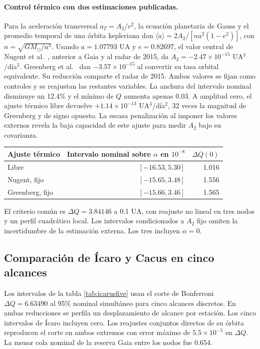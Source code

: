 \documentclass[11pt,a4paper]{article}
\begin{document}
\paragraph{Control térmico con dos estimaciones publicadas.}
Para la aceleración transversal $a_T=A_2/r^2$, la ecuación planetaria de Gauss y el promedio temporal de una órbita kepleriana dan
$\langle\dot a\rangle=2A_2/[na^2(1-e^2)]$, con $n=\sqrt{GM_\odot/a^3}$. Usando $a=1.07793$ UA y $e=0.82697$, el valor central de Nugent et al.\ \cite{nugent}, anterior a Gaia y al radar de 2015, da $A_2=-2.47\times10^{-15}$ UA$^3$/día$^2$. Greenberg et al.\ \cite{icarusradar} dan $-3.57\times10^{-15}$ al convertir su tasa orbital equivalente. Su reducción comparte el radar de 2015. Ambos valores se fijan como controles y se reajustan las restantes variables. La anchura del intervalo nominal disminuye un 12.4\% y el mínimo de $Q$ aumenta apenas 0.03. A amplitud cero, el ajuste térmico libre devuelve $+1.14\times10^{-13}$ UA$^3$/día$^2$, 32 veces la magnitud de Greenberg y de signo opuesto. La escasa penalización al imponer los valores externos revela la baja capacidad de este ajuste para medir $A_2$ bajo su covarianza.
\begin{center}
\begin{tabular}{lrr}
\toprule
Ajuste térmico & Intervalo nominal sobre $\alpha$ en $10^{-8}$ & $\Delta Q(0)$ \\
\midrule
Libre & $[-16.53,5.30]$ & 1.016 \\
Nugent, fijo & $[-15.65,3.48]$ & 1.556 \\
Greenberg, fijo & $[-15.66,3.46]$ & 1.565 \\
\bottomrule
\end{tabular}
\end{center}
El criterio común es $\Delta Q=3.84146$ a 0.1 UA, con reajuste no lineal en tres nodos y un perfil cuadrático local. Los intervalos condicionados a $A_2$ fijo omiten la incertidumbre de la estimación externa. Los tres incluyen $\alpha=0$.

\subsection{Comparación de Ícaro y Cacus en cinco alcances}
Los intervalos de la tabla \ref{tab:icarusfive} usan el corte de Bonferroni $\Delta Q=6.63490$ al 95\% nominal simultáneo para cinco alcances discretos. En ambas reducciones se perfila un desplazamiento de alcance por estación. Los cinco intervalos de Ícaro incluyen cero. Los reajustes conjuntos directos de su órbita reproducen el corte en ambos extremos con error máximo de $5.5\times10^{-5}$ en $\Delta Q$. La menor cola nominal de la reserva Gaia entre los nodos fue 0.654.
\end{document}
